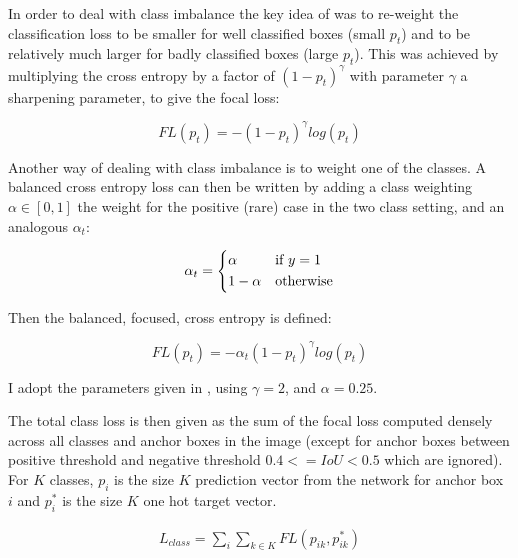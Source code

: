In order to deal with class imbalance the key idea of \cite{Lin2017} was to re-weight the classification loss to be smaller for well classified boxes (small $p_t$) and to be relatively much larger for badly classified boxes (large $p_t$). This was achieved by multiplying the cross entropy by a factor of $(1 - p_t)^\gamma $ with parameter $\gamma$ a sharpening parameter, to give the focal loss:

\begin{equation}
FL(p_t) = - (1 - p_t)^\gamma log(p_t)
\label{eq:focal_loss_p}
\end{equation}

Another way of dealing with class imbalance is to weight one of the classes. A balanced cross entropy loss can then be written by adding a class weighting $\alpha \in \left[0, 1\right]$ the weight for the positive (rare) case in the two class setting, and an analogous $\alpha_t$:

\begin{equation}
\alpha_t = 
  \begin{cases*}
  \alpha & if $y = 1$\\
  1 - \alpha & otherwise\\
  \end{cases*}
\label{eq:balanced_weight}
\end{equation}

Then the balanced, focused, cross entropy is defined:

\begin{equation}
FL(p_t) = -\alpha_t (1 - p_t)^\gamma log(p_t)
\label{eq:focal_loss}
\end{equation}

I adopt the parameters given in \cite{Lin2017}, using $ \gamma = 2 $, and $ \alpha = 0.25 $. 

The total class loss is then given as the sum of the focal loss computed densely across all classes and anchor boxes in the image (except for anchor boxes between positive threshold and negative threshold $0.4 <= IoU < 0.5$ which are ignored). For $K$ classes, $p_i$ is the size $K$ prediction vector from the network for anchor box $i$ and $p^*_i$ is the size $K$ one hot target vector.

\begin{equation}
\begin{split}
L_{class} = \sum_i{\sum_{k \in K}FL(p_{ik}, p^*_{ik})}
\end{split}
\label{eq:class_loss}
\end{equation}

